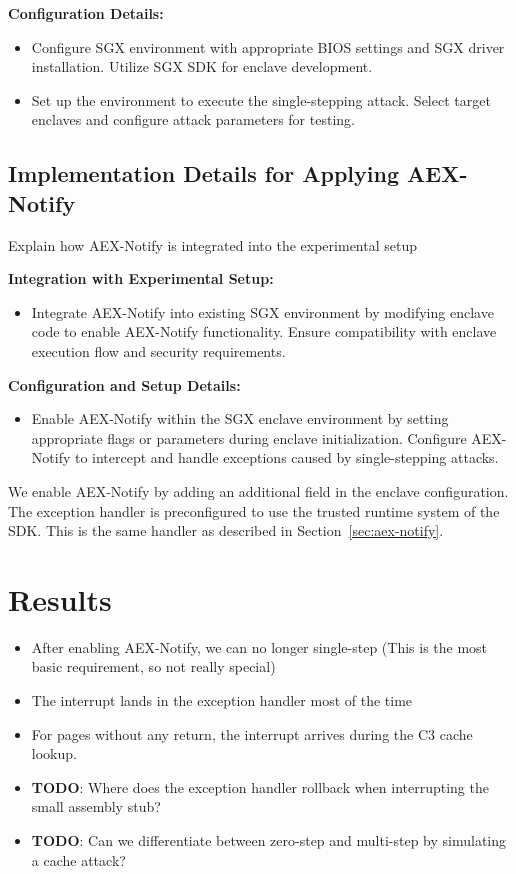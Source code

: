 \documentclass{llncs}
\begin{document}
\textbf{Configuration Details:}
\begin{itemize}
  \item Configure SGX environment with appropriate BIOS settings and SGX driver installation. Utilize SGX SDK for enclave development.
  \item Set up the environment to execute the single-stepping attack. Select target enclaves and configure attack parameters for testing.
\end{itemize}

\subsection{Implementation Details for Applying AEX-Notify}

Explain how AEX-Notify is integrated into the experimental setup

\textbf{Integration with Experimental Setup:}
\begin{itemize}
  \item Integrate AEX-Notify into existing SGX environment by modifying enclave code to enable AEX-Notify functionality. Ensure compatibility with enclave execution flow and security requirements.
\end{itemize}

\textbf{Configuration and Setup Details:}
\begin{itemize}
  \item Enable AEX-Notify within the SGX enclave environment by setting appropriate flags or parameters during enclave initialization. Configure AEX-Notify to intercept and handle exceptions caused by single-stepping attacks.
\end{itemize}

We enable AEX-Notify by adding an additional field in the enclave configuration.
The exception handler is preconfigured to use the trusted runtime system of the SDK.
This is the same handler as described in Section~\ref{sec:aex-notify}.

\section{Results}

\begin{itemize}
  \item After enabling AEX-Notify, we can no longer single-step (This is the most basic requirement, so not really special)
  \item The interrupt lands in the exception handler most of the time
  \item For pages without any return, the interrupt arrives during the C3 cache lookup.
  \item \textbf{TODO}: Where does the exception handler rollback when interrupting the small assembly stub?
  \item \textbf{TODO}: Can we differentiate between zero-step and multi-step by simulating a cache attack?
\end{itemize}
\end{document}
